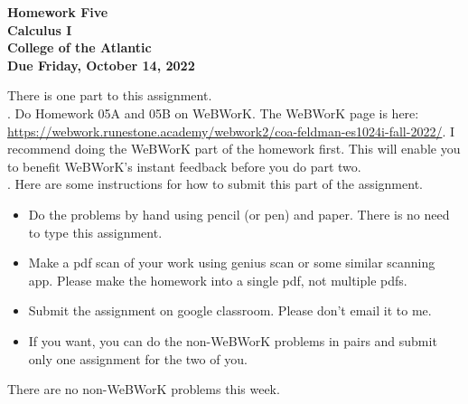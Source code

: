 \documentclass[12pt]{article}
\begin{document}
\pagestyle{empty}
 
\begin{center}
{\LARGE {\bf Homework Five}}\\
\bigskip
{\Large {\bf Calculus I}}\\
\bigskip
{\Large {\bf College of the Atlantic}}\\
\bigskip
{ {\bf Due Friday, October 14, 2022}}\\ 
\end{center}
\medskip


\noindent There is one part to this assignment.\\

.  Do Homework 05A and 05B on
WeBWorK.  The WeBWorK page is here: 
\url{https://webwork.runestone.academy/webwork2/coa-feldman-es1024i-fall-2022/}.
I recommend doing the WeBWorK part of the homework first.  This will
enable you to benefit WeBWorK's instant feedback before you do part
two.\\ 


.  Here are some
instructions for how to submit this part of the assignment.
\begin{itemize}
  \setlength{\itemsep}{0mm}
\item Do the problems by hand using pencil (or pen) and paper.
  There is no need to type this assignment.
\item Make a pdf scan of your work using genius scan or some
  similar scanning app.  Please make the homework into a single
  pdf, not multiple pdfs.
\item Submit the assignment on google classroom.  Please don't
  email it to me.
\item If you want, you can do the non-WeBWorK problems in pairs and
  submit only one assignment for the two of you. \\
\end{itemize}


\noindent There are no non-WeBWorK problems this week.
\end{document}
